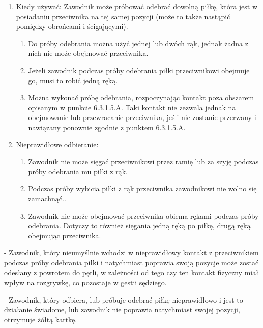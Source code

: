 \documentclass[12pt]{article}
\newcommand\yellowcard{\bgroup\color{yellow}\markoverwith{\textcolor{yellow}{\rule[-0.5ex]{2pt}{0.4pt}}}\ULon}
\newcommand\other{\bgroup\color{green}\markoverwith{\textcolor{green}{\rule[-0.5ex]{2pt}{0.4pt}}}\ULon}
\begin{document}
\begin{enumerate}
	\item
	      Kiedy używać: Zawodnik może próbować odebrać dowolną piłkę, która jest
	      w posiadaniu przeciwnika na tej samej pozycji (może to także nastąpić
	      pomiędzy obrońcami i ścigającymi).

	      \begin{enumerate}
		      \item
		            Do próby odebrania można użyć jednej lub dwóch rąk, jednak żadna z
		            nich nie może obejmować przeciwnika.
		      \item
		            Jeżeli zawodnik podczas próby odebrania piłki przeciwnikowi obejmuje
		            go, musi to robić jedną ręką.
		      \item
		            Można wykonać próbę odebrania, rozpoczynając kontakt poza obszarem
		            opisanym w punkcie 6.3.1.5.A. Taki kontakt nie zezwala jednak na
		            obejmowanie lub przewracanie przeciwnika, jeśli nie zostanie
		            przerwany i nawiązany ponownie zgodnie z punktem 6.3.1.5.A.
	      \end{enumerate}
	\item
	      Nieprawidłowe odbieranie:

	      \begin{enumerate}
		      \item
		            Zawodnik nie może sięgać przeciwnikowi przez ramię lub za szyję
		            podczas próby odebrania mu piłki z rąk.
		      \item
		            Podczas próby wybicia piłki z rąk przeciwnika zawodnikowi nie wolno
		            się zamachnąć..
		      \item
		            Zawodnik nie może obejmować przeciwnika obiema rękami podczas próby
		            odebrania. Dotyczy to również sięgania jedną ręką po piłkę, drugą
		            ręką obejmując przeciwnika.
	      \end{enumerate}
\end{enumerate}

\other{Powrót do pętli} - Zawodnik, który nieumyślnie wchodzi w
nieprawidłowy kontakt z przeciwnikiem podczas próby odebrania piłki i
natychmiast poprawia swoją pozycje może zostać odesłany z powrotem do
pętli, w zależności od tego czy ten kontakt fizyczny miał wpływ na
rozgrywkę, co pozostaje w gestii sędziego.

\yellowcard{Żółta kartka} - Zawodnik, który odbiera, lub próbuje odebrać piłkę
nieprawidłowo i jest to działanie świadome, lub zawodnik nie poprawia
natychmiast swojej pozycji, otrzymuje żółtą kartkę.
\end{document}
